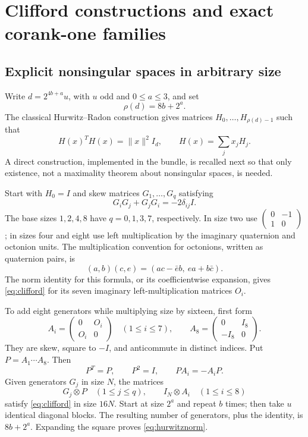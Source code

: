 \documentclass[11pt]{article}
\theoremstyle{definition}
\newcommand{\norm}[1]{\lVert #1\rVert}
\begin{document}
\section{Clifford constructions and exact corank-one families}\label{sec:corank}
\subsection{Explicit nonsingular spaces in arbitrary size}
Write $d=2^{4b+a}u$, with $u$ odd and $0\leq a\leq3$, and set
\begin{equation}\label{eq:rho}
 \rho(d)=8b+2^a.
\end{equation}
The classical Hurwitz--Radon construction gives matrices $H_0,\ldots,H_{\rho(d)-1}$ such that
\begin{equation}\label{eq:hurwitznorm}
 H(x)^TH(x)=\norm{x}^2I_d,\qquad H(x)=\sum_jx_jH_j.
\end{equation}
A direct construction, implemented in the bundle, is recalled next so that only existence, not a maximality theorem about nonsingular spaces, is needed.

Start with $H_0=I$ and skew matrices $G_1,\ldots,G_q$ satisfying
\begin{equation}\label{eq:clifford}
 G_iG_j+G_jG_i=-2\delta_{ij}I.
\end{equation}
The base sizes $1,2,4,8$ have $q=0,1,3,7$, respectively. In size two use $\left(\begin{smallmatrix}0&-1\\1&0\end{smallmatrix}\right)$; in sizes four and eight use left multiplication by the imaginary quaternion and octonion units. The multiplication convention for octonions, written as quaternion pairs, is
\[
 (a,b)(c,e)=(ac-\bar e b,\ ea+b\bar c).
\]
The norm identity for this formula, or its coefficientwise expansion, gives \eqref{eq:clifford} for its seven imaginary left-multiplication matrices $O_i$.

To add eight generators while multiplying size by sixteen, first form
\[
 A_i=\begin{pmatrix}0&O_i\\O_i&0\end{pmatrix}\quad(1\leq i\leq7),
 \qquad A_8=\begin{pmatrix}0&I_8\\-I_8&0\end{pmatrix}.
\]
They are skew, square to $-I$, and anticommute in distinct indices. Put $P=A_1\cdots A_8$. Then
\[
 P^T=P,\qquad P^2=I,\qquad PA_i=-A_iP.
\]
Given generators $G_j$ in size $N$, the matrices
\[
 G_j\otimes P\quad(1\leq j\leq q),\qquad
 I_N\otimes A_i\quad(1\leq i\leq8)
\]
satisfy \eqref{eq:clifford} in size $16N$. Start at size $2^a$ and repeat $b$ times; then take $u$ identical diagonal blocks. The resulting number of generators, plus the identity, is $8b+2^a$. Expanding the square proves \eqref{eq:hurwitznorm}.
\end{document}
